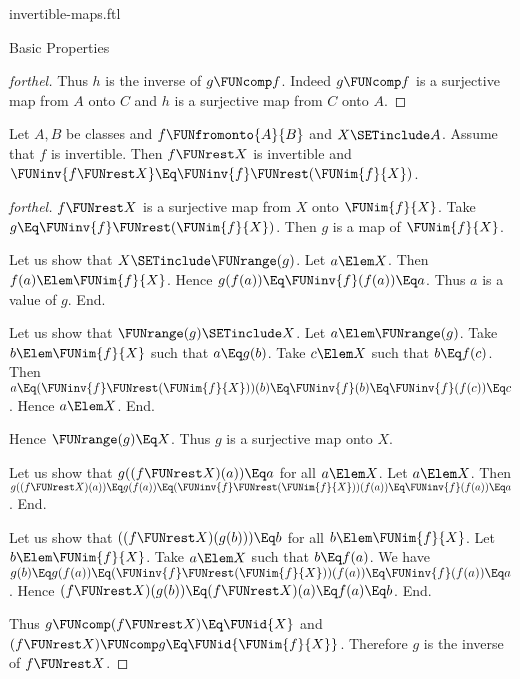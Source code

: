 \documentclass{stex}
\begin{document}
\begin{smodule}{invertible-maps.ftl}
\begin{sfragment}{Basic Properties}
\begin{proof}[forthel]
    Thus $h$ is the inverse of $g \FUNcomp f$.
    Indeed $g \FUNcomp f$ is a surjective map from $A$ onto $C$ and $h$ is a surjective map from $C$ onto $A$.
  \end{proof}

  \begin{proposition}[forthel]
    Let $A, B$ be classes and $f \FUNfromonto{A}{B}$ and $X \SETinclude A$.
    Assume that $f$ is invertible.
    Then $f \FUNrest X$ is invertible and $\FUNinv{f\FUNrest X} \Eq \FUNinv{f} \FUNrest (\FUNim{f}{X})$.
  \end{proposition}
  \begin{proof}[forthel]
    $f \FUNrest X$ is a surjective map from $X$ onto $\FUNim{f}{X}$.
    Take $g \Eq \FUNinv{f} \FUNrest (\FUNim{f}{X})$.
    Then $g$ is a map of $\FUNim{f}{X}$.

    Let us show that $X \SETinclude \FUNrange(g)$.
      Let $a \Elem X$.
      Then $f(a) \Elem \FUNim{f}{X}$.
      Hence $g(f(a)) \Eq \FUNinv{f}(f(a)) \Eq a$.
      Thus $a$ is a value of $g$.
    End.

    Let us show that $\FUNrange(g) \SETinclude X$.
      Let $a \Elem \FUNrange(g)$.
      Take $b \Elem \FUNim{f}{X}$ such that $a \Eq g(b)$.
      Take $c \Elem X$ such that $b \Eq f(c)$.
      Then $a
        \Eq (\FUNinv{f} \FUNrest (\FUNim{f}{X}))(b)
        \Eq \FUNinv{f}(b)
        \Eq \FUNinv{f}(f(c))
        \Eq c$.
      Hence $a \Elem X$.
    End.

    Hence $\FUNrange(g) \Eq X$.
    Thus $g$ is a surjective map onto $X$.

    Let us show that $g((f \FUNrest X)(a)) \Eq a$ for all $a \Elem X$.
      Let $a \Elem X$.
      Then $g((f \FUNrest X)(a))
        \Eq g(f(a))
        \Eq (\FUNinv{f} \FUNrest (\FUNim{f}{X}))(f(a))
        \Eq \FUNinv{f}(f(a))
        \Eq a$.
    End.

    Let us show that $((f \FUNrest X)(g(b))) \Eq b$ for all $b \Elem \FUNim{f}{X}$.
      Let $b \Elem \FUNim{f}{X}$.
      Take $a \Elem X$ such that $b \Eq f(a)$.
      We have $g(b)
        \Eq g(f(a))
        \Eq (\FUNinv{f} \FUNrest (\FUNim{f}{X}))(f(a))
        \Eq \FUNinv{f}(f(a))
        \Eq a$.
      Hence $(f \FUNrest X)(g(b))
        \Eq (f \FUNrest X)(a)
        \Eq f(a)
        \Eq b$.
    End.

    Thus $g \FUNcomp (f \FUNrest X) \Eq \FUNid{X}$ and $(f \FUNrest X) \FUNcomp g \Eq \FUNid{\FUNim{f}{X}}$.
    Therefore $g$ is the inverse of $f \FUNrest X$.
  \end{proof}


\end{sfragment}
\end{smodule}
\end{document}
